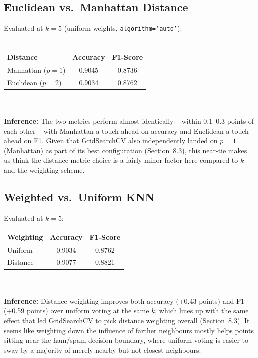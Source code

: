 \documentclass[12pt,a4paper]{article}
\begin{document}
\subsection{Euclidean vs.\ Manhattan Distance}
Evaluated at $k=5$ (uniform weights, \texttt{algorithm='auto'}): \\ \\
\begin{tabular}{lcc}
\toprule
Distance & Accuracy & F1-Score\\
\midrule
Manhattan ($p=1$) & 0.9045 & 0.8736 \\
Euclidean ($p=2$) & 0.9034 & 0.8762 \\
\bottomrule
\end{tabular} \\ \\
\textbf{Inference:} The two metrics perform almost identically -- within 0.1--0.3 points of each other -- with Manhattan a touch ahead on accuracy and Euclidean a touch ahead on F1. Given that GridSearchCV also independently landed on $p=1$ (Manhattan) as part of its best configuration (Section~8.3), this near-tie makes us think the distance-metric choice is a fairly minor factor here compared to $k$ and the weighting scheme.
 
\subsection{Weighted vs.\ Uniform KNN}
Evaluated at $k=5$: \\
\begin{tabular}{lcc}
\toprule
Weighting & Accuracy & F1-Score\\
\midrule
Uniform  & 0.9034 & 0.8762 \\
Distance & 0.9077 & 0.8821 \\
\bottomrule
\end{tabular} \\ \\
\textbf{Inference:} Distance weighting improves both accuracy (+0.43 points) and F1 (+0.59 points) over uniform voting at the same $k$, which lines up with the same effect that led GridSearchCV to pick distance weighting overall (Section~8.3). It seems like weighting down the influence of farther neighbours mostly helps points sitting near the ham/spam decision boundary, where uniform voting is easier to sway by a majority of merely-nearby-but-not-closest neighbours.
 
\end{document}
